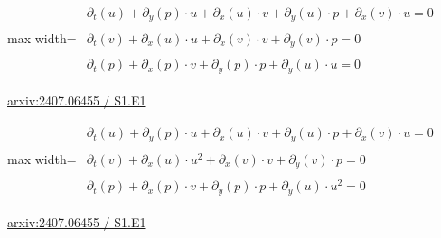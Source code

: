 \documentclass[10pt,a4paper]{article}
\begin{document}
\begin{minipage}{\linewidth}
\begin{center}\begin{adjustbox}{max width=\linewidth}$\displaystyle\begin{gathered}\begin{gathered}\partial_{t}(u)+\partial_{y}(p)\cdot u+\partial_{x}(u)\cdot v+\partial_{y}(u)\cdot p+\partial_{x}(v)\cdot u=0\end{gathered}\\[5pt]\begin{gathered}\partial_{t}(v)+\partial_{x}(u)\cdot u+\partial_{x}(v)\cdot v+\partial_{y}(v)\cdot p=0\end{gathered}\\[5pt]\begin{gathered}\partial_{t}(p)+\partial_{x}(p)\cdot v+\partial_{y}(p)\cdot p+\partial_{y}(u)\cdot u=0\end{gathered}\end{gathered}$\end{adjustbox}\end{center}
{\small \href{https://arxiv.org/html/2407.06455#S1.E1}{arxiv:2407.06455 / S1.E1}}\par
\end{minipage}\par\vspace{7mm}

\begin{minipage}{\linewidth}
\begin{center}\begin{adjustbox}{max width=\linewidth}$\displaystyle\begin{gathered}\begin{gathered}\partial_{t}(u)+\partial_{y}(p)\cdot u+\partial_{x}(u)\cdot v+\partial_{y}(u)\cdot p+\partial_{x}(v)\cdot u=0\end{gathered}\\[5pt]\begin{gathered}\partial_{t}(v)+\partial_{x}(u)\cdot u^{2}+\partial_{x}(v)\cdot v+\partial_{y}(v)\cdot p=0\end{gathered}\\[5pt]\begin{gathered}\partial_{t}(p)+\partial_{x}(p)\cdot v+\partial_{y}(p)\cdot p+\partial_{y}(u)\cdot u^{2}=0\end{gathered}\end{gathered}$\end{adjustbox}\end{center}
{\small \href{https://arxiv.org/html/2407.06455#S1.E1}{arxiv:2407.06455 / S1.E1}}\par
\end{minipage}\par\vspace{7mm}
\end{document}
